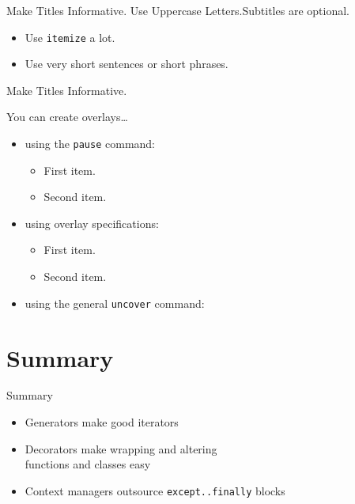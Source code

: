 \documentclass{beamer}
\begin{document}
\begin{frame}{Make Titles Informative. Use Uppercase Letters.}{Subtitles are optional.}

  \begin{itemize}
  \item
    Use \texttt{itemize} a lot.
  \item
    Use very short sentences or short phrases.
  \end{itemize}
\end{frame}

\begin{frame}{Make Titles Informative.}

  You can create overlays\dots
  \begin{itemize}
  \item using the \texttt{pause} command:
    \begin{itemize}
    \item
      First item.
      \pause
    \item    
      Second item.
    \end{itemize}
  \item
    using overlay specifications:
    \begin{itemize}
    \item<3->
      First item.
    \item<4->
      Second item.
    \end{itemize}
  \item
    using the general \texttt{uncover} command:
    \begin{itemize}
    \end{itemize}
  \end{itemize}
\end{frame}


\section*{Summary}

\begin{frame}{Summary}

  \begin{itemize}[<+->]
  \item
    \alert{Generators} make good iterators
  \item
    \alert{Decorators} make wrapping and altering\\functions and classes easy
  \item
    \alert{Context managers} outsource \texttt{except..finally} blocks
  \end{itemize}
\end{frame}
\end{document}
